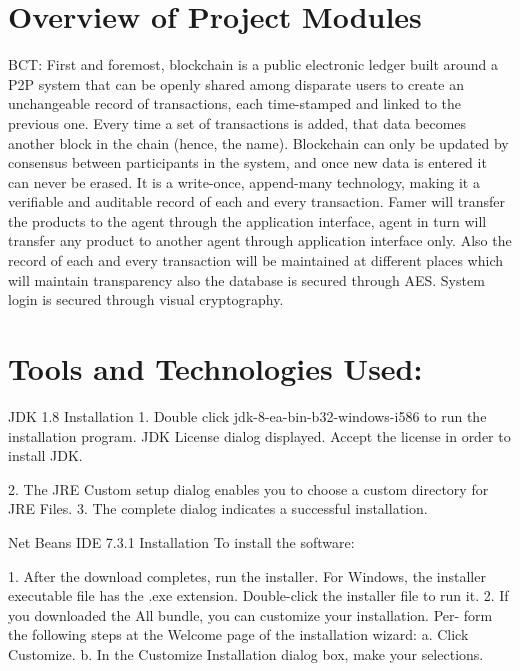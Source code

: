 \documentclass[oneside,a4paper,12pt]{report}
\begin{document}
{\section{Overview of Project Modules}
BCT: First and foremost, blockchain is a public electronic ledger built around a P2P system that can be openly shared among disparate users to create an unchangeable record of transactions, each time-stamped and linked to the previous one. Every time a set of transactions is added, that data becomes another block in the chain (hence, the name). Blockchain can only be updated by consensus between participants in the system, and once new data is entered it can never be erased. It is a write-once, append-many technology, making it a verifiable and auditable record of each and every transaction.
Famer will transfer the products to the agent through the application interface, agent in turn will transfer any product to another agent through application interface only. Also the record of each and every transaction will be maintained at different places which will maintain transparency also the database is secured through AES. System login is secured through visual cryptography.
\section{Tools and Technologies Used:}
JDK 1.8 Installation
1.	Double click jdk-8-ea-bin-b32-windows-i586 to run the installation program.
JDK License dialog displayed. Accept the license in order to install JDK.

2.	The JRE Custom setup dialog enables you to choose a custom directory for JRE Files.
3.	The complete dialog indicates a successful installation.

Net Beans IDE 7.3.1 Installation
To install the software:

1.	After the download completes, run the installer. For Windows, the installer executable file has the .exe extension. Double-click the installer file to run it.
2.	If you downloaded the All bundle, you can customize your installation. Per- form the following steps at the Welcome page of the installation wizard:
a.	Click Customize.
b.	In the Customize Installation dialog box, make your selections.

}
\end{document}
